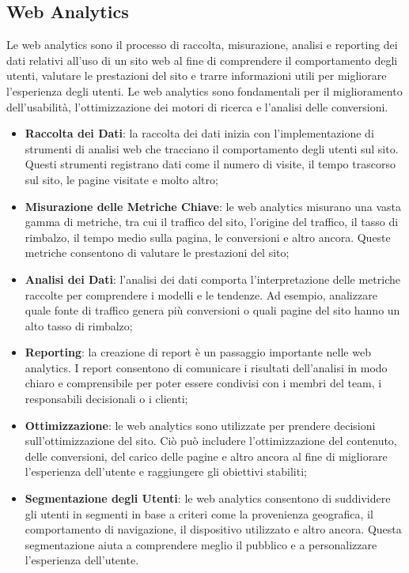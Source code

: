 \documentclass[target=bach,aauheader=]{thud}
\begin{document}
\subsection{Web Analytics}\label{subsec:umami}
Le web analytics sono il processo di raccolta, misurazione, analisi e reporting dei dati relativi all'uso di un sito web al fine di comprendere il comportamento degli utenti, valutare le prestazioni del sito e trarre informazioni utili per  migliorare l'esperienza degli utenti. 
Le web analytics sono fondamentali per il miglioramento dell'usabilità, l'ottimizzazione dei motori di ricerca e l'analisi delle conversioni.
\begin{itemize}
    \item \textbf{Raccolta dei Dati}: la raccolta dei dati inizia con l'implementazione di strumenti di analisi web che tracciano il comportamento degli utenti sul sito. Questi strumenti registrano dati come il numero di visite, il tempo trascorso sul sito, le pagine visitate e molto altro;
    \item \textbf{Misurazione delle Metriche Chiave}: le web analytics misurano una vasta gamma di metriche, tra cui il traffico del sito, l'origine del traffico, il tasso di rimbalzo, il tempo medio sulla pagina, le conversioni e altro ancora. Queste metriche consentono di valutare le prestazioni del sito;
    \item \textbf{Analisi dei Dati}: l'analisi dei dati comporta l'interpretazione delle metriche raccolte per comprendere i modelli e le tendenze. Ad esempio, analizzare quale fonte di traffico genera più conversioni o quali pagine del sito hanno un alto tasso di rimbalzo;
    \item \textbf{Reporting}: la creazione di report è un passaggio importante nelle web analytics. I report consentono di comunicare i risultati dell'analisi in modo chiaro e comprensibile per poter essere condivisi con i membri del team, i responsabili decisionali o i clienti;
    \item \textbf{Ottimizzazione}: le web analytics sono utilizzate per prendere decisioni sull'ottimizzazione del sito. Ciò può includere l'ottimizzazione del contenuto, delle conversioni, del carico delle pagine e altro ancora al fine di migliorare l'esperienza dell'utente e raggiungere gli obiettivi stabiliti;
    \item \textbf{Segmentazione degli Utenti}: le web analytics consentono di suddividere gli utenti in segmenti in base a criteri come la provenienza geografica, il comportamento di navigazione, il dispositivo utilizzato e altro ancora. Questa segmentazione aiuta a comprendere meglio il pubblico e a personalizzare l'esperienza dell'utente.
\end{itemize}
\end{document}
